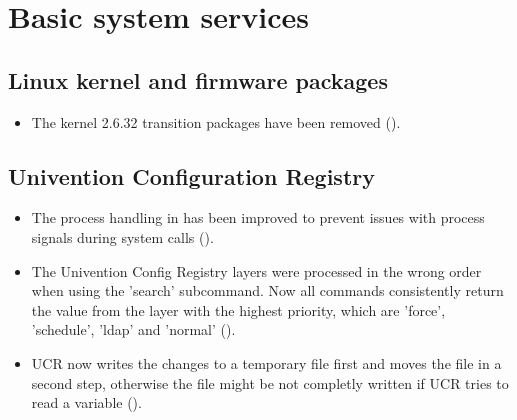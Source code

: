 

\section{Basic system services}


\subsection{Linux kernel and firmware packages}
\begin{itemize}
\item The kernel 2.6.32 transition packages have been removed ().
\end{itemize}

\subsection{Univention Configuration Registry}
\begin{itemize}
\item The process handling in  has been improved to prevent issues with process
  signals during system calls ().

\item The Univention Config Registry layers were processed in the wrong order when using the 'search' subcommand. Now all commands consistently return the value from the layer with the highest priority, which are 'force', 'schedule', 'ldap' and 'normal' ().

\item UCR now writes the changes to a temporary file first and moves the file
in a second step, otherwise the file might be not completly written if UCR
tries to read a variable ().
\end{itemize}

